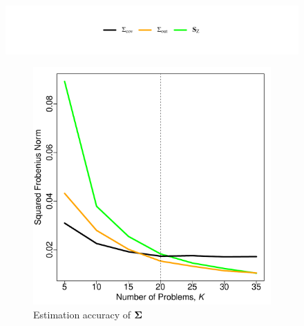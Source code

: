 \documentclass[11pt]{article}
\theoremstyle{definition}
\theoremstyle{definition}
\def\bSigma{{\bf \Sigma}}
\begin{document}
\begin{figure}[t!]
\vspace{-2em}
\centering
\hspace*{0em} 	\includegraphics{legendSim.pdf} %
\vspace{-4em}

        \begin{subfigure}{0.5\textwidth}
                \includegraphics[width=\textwidth]{simResSigma.pdf}
                \caption{Estimation accuracy of $\bSigma$}
                \label{Sigma}
        \end{subfigure}%
        \begin{subfigure}{0.5\textwidth}

\end{subfigure}
\end{figure}
\end{document}
